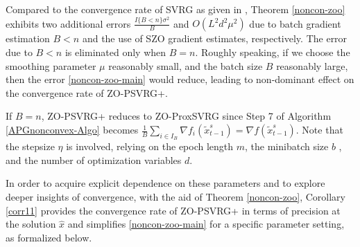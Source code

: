 \documentclass{article}
\theoremstyle{definition}
\theoremstyle{remark}
\begin{document}
{\color{Brown}
Compared to the convergence rate of SVRG as given in \cite{reddi2016proximal}, Theorem \ref{noncon-zoo} exhibits two
additional errors $\frac{I\{B < n\}\sigma ^2}{B}$ and $O(L^2d^2\mu^2)$ due to batch gradient estimation $B < n$ and the use of SZO gradient estimates, respectively. The error due to $B < n$ is eliminated only when $B = n$. Roughly
speaking, if we choose the smoothing parameter $\mu$ reasonably small, and the batch size $B$ reasonably large, then the error \eqref{noncon-zoo-main}
would reduce, leading to non-dominant effect on the convergence rate of ZO-PSVRG+. 

{\color{Brown}
If $B = n$, ZO-PSVRG+ reduces to ZO-ProxSVRG  since Step 7 of Algorithm \ref{APGnonconvex-Algo} becomes
$\frac{1}{B}\sum_{i\in I_B} \nabla f_i(\widetilde{x}^s_{t-1}) = \nabla f(\widetilde{x}^s_{t-1})$. }
Note that the stepsize  $\eta$ is involved, relying on the epoch length $m$, the minibatch size $b$ , and the number of optimization variables $d$. 
}

{\color{Brown}
In order to acquire explicit dependence on these parameters and to explore deeper insights of convergence, with the aid of Theorem \ref{noncon-zoo}, Corollary \ref{corr11} provides the convergence rate of ZO-PSVRG+ in terms of precision at the solution $\hat{x}$ and  simplifies \eqref{noncon-zoo-main} for a specific parameter setting, as formalized below.
}
\end{document}
